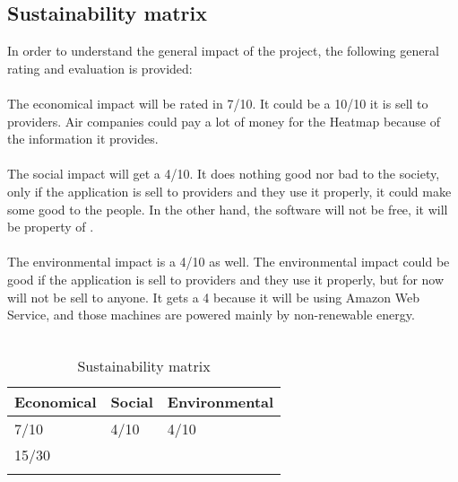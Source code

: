 \subsection{Sustainability matrix}

In order to understand the general impact of the project, the following general rating and evaluation is provided:
\\\\
The economical impact will be rated in 7/10. It could be a 10/10 it is sell to providers. Air companies could pay a lot of money for the Heatmap because of the information it provides.
\\\\
The social impact will get a 4/10. It does nothing good nor bad to the society, only if the application is sell to providers and they use it properly, it could make some good to the people. In the other hand, the software will not be free, it will be property of \company.
\\\\
The environmental impact is a 4/10 as well. The environmental impact could be good if the application is sell to providers and they use it properly, but for now will not be sell to anyone. It gets a 4 because it will be using Amazon Web Service, and those machines are powered mainly by non-renewable energy\cite{click_clean}.
\\\\

\begin{table}[H]
\centering
\begin{tabular}{|l|l|l|}
\hline
Economical & Social & Environmental \\ \hline
7/10       & 4/10   & 4/10          \\ \hline
\multicolumn{3}{|l|}{15/30}         \\ \hline
\caption{Sustainability matrix}
\label{sustainability-matrix}
\end{tabular}
\end{table}

